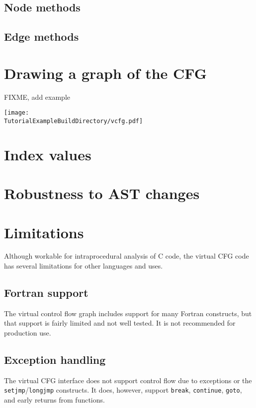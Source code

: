 \subsection{Node methods}

\subsection{Edge methods}

\section{Drawing a graph of the CFG}

FIXME, add example

\texttt{[image: \\TutorialExampleBuildDirectory/vcfg.pdf]}

\section{Index values}
\label{cfg_index_values}

\section{Robustness to AST changes}

\section{Limitations}

Although workable for intraprocedural analysis of C code, the virtual CFG
code has several limitations for other languages and uses.

\subsection{Fortran support}

The virtual control flow graph includes support for many Fortran
constructs, but that support is fairly limited and not well tested.  It is
not recommended for production use.

\subsection{Exception handling}

The virtual CFG interface does not support control flow due to exceptions
or the \lstinline{setjmp}/\lstinline{longjmp} constructs.
It does, however, support \lstinline{break}, \lstinline{continue},
\lstinline{goto}, and early returns from functions.

